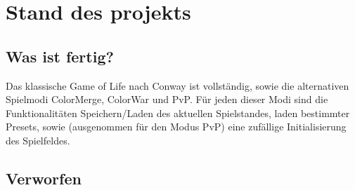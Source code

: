 \documentclass[12pt]{article}
\theoremstyle{plain}
\begin{document}
\section{Stand des projekts}
\subsection{Was ist fertig?}
Das klassische Game of Life nach Conway ist vollständig, sowie die alternativen Spielmodi ColorMerge, ColorWar und PvP.
Für jeden dieser Modi sind die Funktionalitäten Speichern/Laden des aktuellen Spielstandes, laden bestimmter Presets, sowie (ausgenommen für den Modus PvP) eine zufällige Initialisierung des Spielfeldes.
\subsection{Verworfen}
\end{document}
